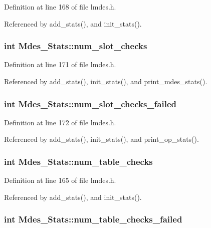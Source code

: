 Definition at line 168 of file lmdes.h.

Referenced by add\_\-stats(), and init\_\-stats().
\subsubsection{\setlength{\rightskip}{0pt plus 5cm}int \bf{Mdes\_\-Stats::num\_\-slot\_\-checks}}\label{structMdes__Stats_7ff97edda08e7f5d28fd5a5326ce4148}




Definition at line 171 of file lmdes.h.

Referenced by add\_\-stats(), init\_\-stats(), and print\_\-mdes\_\-stats().
\subsubsection{\setlength{\rightskip}{0pt plus 5cm}int \bf{Mdes\_\-Stats::num\_\-slot\_\-checks\_\-failed}}\label{structMdes__Stats_c1a823436a55ee6be369aa154404beb0}




Definition at line 172 of file lmdes.h.

Referenced by add\_\-stats(), init\_\-stats(), and print\_\-op\_\-stats().
\subsubsection{\setlength{\rightskip}{0pt plus 5cm}int \bf{Mdes\_\-Stats::num\_\-table\_\-checks}}\label{structMdes__Stats_0363a6381aaa849c5759bc3e03c49d54}




Definition at line 165 of file lmdes.h.

Referenced by add\_\-stats(), and init\_\-stats().
\subsubsection{\setlength{\rightskip}{0pt plus 5cm}int \bf{Mdes\_\-Stats::num\_\-table\_\-checks\_\-failed}}\label{structMdes__Stats_9f75994a7a2e0d7424f380624e13425d}




